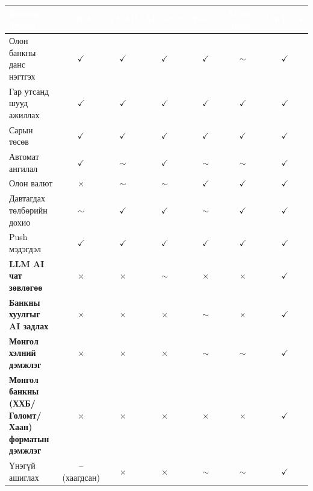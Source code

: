 \begin{table}[ht]
\centering
\scriptsize
\renewcommand{\arraystretch}{1.2}
\begin{tabular}{|p{4.0cm}|c|c|c|c|c|c|}
\hline
\rowcolor{darknavy}
\textcolor{white}{\textbf{Боломж / Функц}} &
\textcolor{white}{\textbf{Mint}} &
\textcolor{white}{\textbf{YNAB}} &
\textcolor{white}{\textbf{Monarch}} &
\textcolor{white}{\textbf{Wallet}} &
\textcolor{white}{\textbf{Money Lover}} &
\textcolor{white}{\textbf{\textbf{FinTrack}}} \\ \hline
Олон банкны данс нэгтгэх        & $\checkmark$ & $\checkmark$ & $\checkmark$ & $\checkmark$ & $\sim$        & $\checkmark$ \\ \hline
Гар утсанд шууд ажиллах         & $\checkmark$ & $\checkmark$ & $\checkmark$ & $\checkmark$ & $\checkmark$  & $\checkmark$ \\ \hline
Сарын төсөв                     & $\checkmark$ & $\checkmark$ & $\checkmark$ & $\checkmark$ & $\checkmark$  & $\checkmark$ \\ \hline
Автомат ангилал                 & $\checkmark$ & $\sim$       & $\checkmark$ & $\sim$       & $\sim$        & $\checkmark$ \\ \hline
Олон валют                      & $\times$     & $\sim$       & $\sim$       & $\checkmark$ & $\checkmark$  & $\checkmark$ \\ \hline
Давтагдах төлбөрийн дохио       & $\sim$       & $\checkmark$ & $\checkmark$ & $\sim$       & $\checkmark$  & $\checkmark$ \\ \hline
Push мэдэгдэл                   & $\checkmark$ & $\checkmark$ & $\checkmark$ & $\checkmark$ & $\checkmark$  & $\checkmark$ \\ \hline
\textbf{LLM AI чат зөвлөгөө}    & $\times$     & $\times$     & $\sim$       & $\times$     & $\times$      & $\checkmark$ \\ \hline
\textbf{Банкны хуулгыг AI задлах} & $\times$   & $\times$     & $\times$     & $\sim$       & $\times$      & $\checkmark$ \\ \hline
\textbf{Монгол хэлний дэмжлэг}  & $\times$     & $\times$     & $\times$     & $\sim$       & $\sim$        & $\checkmark$ \\ \hline
\textbf{Монгол банкны (ХХБ/Голомт/Хаан) форматын дэмжлэг} & $\times$ & $\times$ & $\times$ & $\times$ & $\times$ & $\checkmark$ \\ \hline
Үнэгүй ашиглах                  & -- (хаагдсан) & $\times$     & $\times$     & $\sim$       & $\sim$        & $\checkmark$ \\ \hline

\end{tabular}
\end{table}
